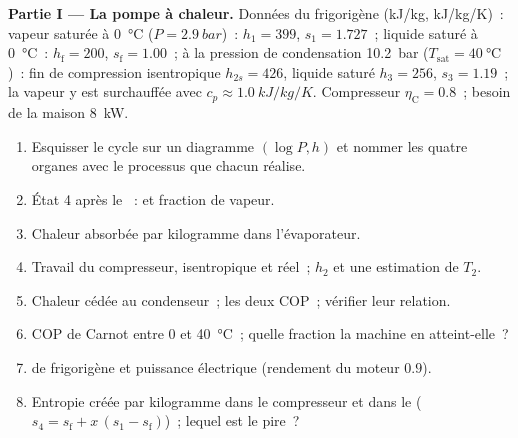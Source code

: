 \begin{problem}\label{pb:b2:open-systems:1}
\textbf{Partie I --- La pompe à chaleur.}
Données du frigorigène (\unit{kJ/kg}, \unit{kJ/kg/K})~: vapeur saturée à
\qty{0}{\celsius} ($P = \qty{2.9}{bar}$)~: $h_1 = 399$, $s_1 = 1.727$~;
liquide saturé à \qty{0}{\celsius}~: $h_{\text{f}} = 200$, $s_{\text{f}} = 1.00$~;
à la pression de condensation \qty{10.2}{bar} ($T_{\text{sat}} = \qty{40}{\celsius}$)~:
fin de compression isentropique $h_{2s} = 426$, liquide saturé $h_3 = 256$,
$s_3 = 1.19$~; la vapeur y est surchauffée avec $c_p \approx \qty{1.0}{kJ/kg/K}$.
Compresseur $\eta_{\text{C}} = 0.8$~; besoin de la maison \qty{8}{kW}.
\begin{enumerate}
  \item Esquisser le cycle sur un diagramme $(\log P, h)$ et nommer les quatre
        organes avec le processus que chacun réalise.
  \item État 4 après le ~:  et fraction de vapeur.
  \item Chaleur absorbée par kilogramme dans l'évaporateur.
  \item Travail du compresseur, isentropique et réel~; $h_2$ et une estimation de
        $T_2$.
  \item Chaleur cédée au condenseur~; les deux COP~; vérifier leur
        relation.
  \item COP de Carnot entre \qty{0}{} et \qty{40}{\celsius}~; quelle
        fraction la machine en atteint-elle~?
  \item {} de frigorigène et puissance électrique (rendement du
        moteur $0.9$).
  \item Entropie créée par kilogramme dans le compresseur et dans le
         ($s_4 = s_{\text{f}} + x\,(s_1 - s_{\text{f}})$)~; lequel est le
        pire~?
\end{enumerate}


\end{problem}
